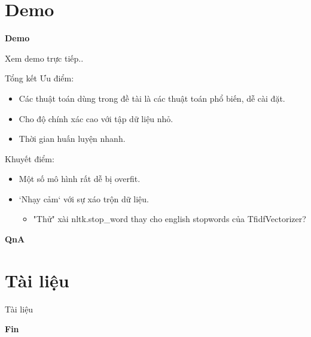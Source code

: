 \documentclass[aspectratio=169,xcolor=dvipsnames]{beamer}
\begin{document}
\section{Demo}
\begin{frame}
    \Huge{\centerline{\textbf{Demo}}}
    \centerline{Xem demo trực tiếp..}
\end{frame}

\begin{frame}{Tổng kết}
Ưu điểm:
\begin{itemize}
\item Các thuật toán dùng trong đề tài là các thuật toán phổ biến, dễ cài đặt.
\item Cho độ chính xác cao với tập dữ liệu nhỏ.
\item Thời gian huấn luyện nhanh.
\end{itemize}
Khuyết điểm:
\begin{itemize}
\item Một số mô hình rất dễ bị overfit.
\item `Nhạy cảm` với sự xáo trộn dữ liệu.\cite{Kowsari_2019}
\begin{itemize}
	\item "Thử" xài nltk.stop\_word thay cho english stopwords của TfidfVectorizer?
\end{itemize}
\end{itemize}
\end{frame}

\begin{frame}
    \Huge{\centerline{\textbf{QnA}}}
\end{frame}

\section{Tài liệu}

\begin{frame}{Tài liệu}
	\printbibliography
\end{frame}

\begin{frame}
    \Huge{\centerline{\textbf{Fin}}}
\end{frame}
\end{document}
